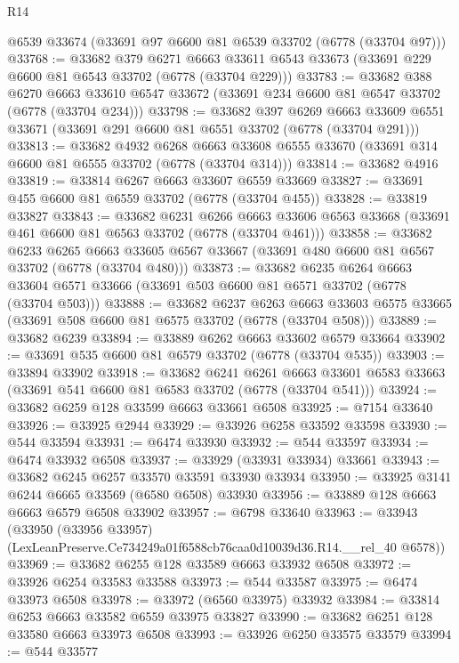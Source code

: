 \begin{lexlean}{R14}
\begin{coremodule}
    @6539
    @33674
    (@33691 @97 @6600 @81 @6539 @33702 (@6778 (@33704 @97)))
@33768 := @33682
    @379
    @6271
    @6663
    @33611
    @6543
    @33673
    (@33691 @229 @6600 @81 @6543 @33702 (@6778 (@33704 @229)))
@33783 := @33682
    @388
    @6270
    @6663
    @33610
    @6547
    @33672
    (@33691 @234 @6600 @81 @6547 @33702 (@6778 (@33704 @234)))
@33798 := @33682
    @397
    @6269
    @6663
    @33609
    @6551
    @33671
    (@33691 @291 @6600 @81 @6551 @33702 (@6778 (@33704 @291)))
@33813 := @33682
    @4932
    @6268
    @6663
    @33608
    @6555
    @33670
    (@33691 @314 @6600 @81 @6555 @33702 (@6778 (@33704 @314)))
@33814 := @33682 @4916
@33819 := @33814 @6267 @6663 @33607 @6559 @33669
@33827 := @33691 @455 @6600 @81 @6559 @33702 (@6778 (@33704 @455))
@33828 := @33819 @33827
@33843 := @33682
    @6231
    @6266
    @6663
    @33606
    @6563
    @33668
    (@33691 @461 @6600 @81 @6563 @33702 (@6778 (@33704 @461)))
@33858 := @33682
    @6233
    @6265
    @6663
    @33605
    @6567
    @33667
    (@33691 @480 @6600 @81 @6567 @33702 (@6778 (@33704 @480)))
@33873 := @33682
    @6235
    @6264
    @6663
    @33604
    @6571
    @33666
    (@33691 @503 @6600 @81 @6571 @33702 (@6778 (@33704 @503)))
@33888 := @33682
    @6237
    @6263
    @6663
    @33603
    @6575
    @33665
    (@33691 @508 @6600 @81 @6575 @33702 (@6778 (@33704 @508)))
@33889 := @33682 @6239
@33894 := @33889 @6262 @6663 @33602 @6579 @33664
@33902 := @33691 @535 @6600 @81 @6579 @33702 (@6778 (@33704 @535))
@33903 := @33894 @33902
@33918 := @33682
    @6241
    @6261
    @6663
    @33601
    @6583
    @33663
    (@33691 @541 @6600 @81 @6583 @33702 (@6778 (@33704 @541)))
@33924 := @33682 @6259 @128 @33599 @6663 @33661 @6508
@33925 := @7154 @33640
@33926 := @33925 @2944
@33929 := @33926 @6258 @33592 @33598
@33930 := @544 @33594
@33931 := @6474 @33930
@33932 := @544 @33597
@33934 := @6474 @33932 @6508
@33937 := @33929 (@33931 @33934) @33661
@33943 := @33682 @6245 @6257 @33570 @33591 @33930 @33934
@33950 := @33925 @3141 @6244 @6665 @33569 (@6580 @6508) @33930
@33956 := @33889 @128 @6663 @6663 @6579 @6508 @33902
@33957 := @6798 @33640
@33963 := @33943
    (@33950 (@33956 @33957) (LexLeanPreserve.Ce734249a01f6588cb76caa0d10039d36.R14.__rel_40 @6578))
@33969 := @33682 @6255 @128 @33589 @6663 @33932 @6508
@33972 := @33926 @6254 @33583 @33588
@33973 := @544 @33587
@33975 := @6474 @33973 @6508
@33978 := @33972 (@6560 @33975) @33932
@33984 := @33814 @6253 @6663 @33582 @6559 @33975 @33827
@33990 := @33682 @6251 @128 @33580 @6663 @33973 @6508
@33993 := @33926 @6250 @33575 @33579
@33994 := @544 @33577

\end{coremodule}
\end{lexlean}
